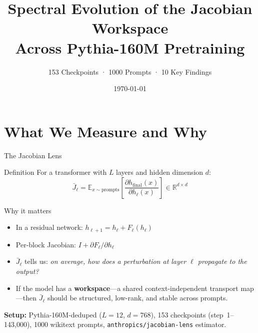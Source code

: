\documentclass[aspectratio=169,11pt]{beamer}
\title[J-Lens × Pythia-160M]{Spectral Evolution of the Jacobian Workspace\\Across Pythia-160M Pretraining}
\subtitle{153 Checkpoints · 1000 Prompts · 10 Key Findings}
\author{}
\institute{}
\date{\today}
\begin{document}
\frame{\titlepage}

\section{What We Measure and Why}

\begin{frame}{The Jacobian Lens}
\begin{block}{Definition}
For a transformer with $L$ layers and hidden dimension $d$:
\[
\bar{J}_\ell = \mathbb{E}_{x\sim\text{prompts}}\!\left[
\frac{\partial h_{\text{final}}(x)}{\partial h_\ell(x)}
\right] \in \mathbb{R}^{d \times d}
\]
\end{block}

\begin{block}{Why it matters}
\begin{itemize}
\item In a residual network: $h_{\ell+1} = h_\ell + F_\ell(h_\ell)$
\item Per-block Jacobian: $I + \partial F_\ell / \partial h_\ell$
\item $\bar{J}_\ell$ tells us: \emph{on average, how does a perturbation at layer $\ell$ propagate to the output?}
\item If the model has a \textbf{workspace}---a shared context-independent transport map---then $\bar{J}_\ell$ should be structured, low-rank, and stable across prompts.
\end{itemize}
\end{block}

\vspace{6pt}
\textbf{Setup:} Pythia-160M-deduped ($L=12$, $d=768$), 153 checkpoints (step~1--143,000), 1000 wikitext prompts, \texttt{anthropics/jacobian-lens} estimator.
\end{frame}
\end{document}
